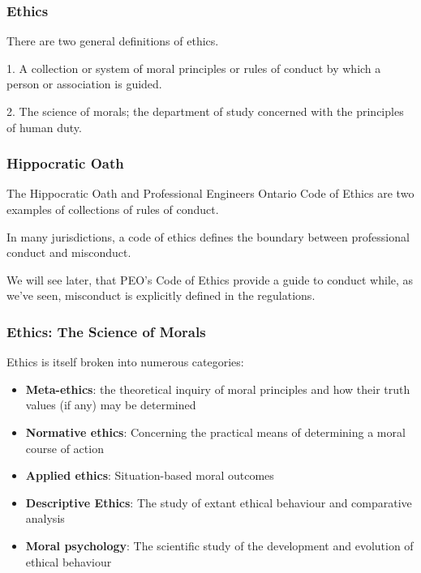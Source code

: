 \begin{frame}
\frametitle{Ethics}

There are two general definitions of ethics.

1. A collection or system of moral principles or rules of conduct by which a person or association is guided.


2. The science of morals; the department of study concerned with the principles of human duty.

\end{frame}



\begin{frame}
\frametitle{Hippocratic Oath}

The Hippocratic Oath and Professional Engineers Ontario Code of Ethics are two examples of collections of rules of conduct.

In many jurisdictions, a code of ethics defines the boundary between professional conduct and misconduct.

We will see later, that PEO's Code of Ethics provide a guide to conduct while, as we've seen, misconduct is explicitly defined in the regulations.

\end{frame}



\begin{frame}
\frametitle{Ethics: The Science of Morals}


Ethics is itself broken into numerous categories:
\begin{itemize}
	\item \textbf{Meta-ethics}:
the theoretical inquiry of moral principles and how their truth values (if any) may be determined
	\item \textbf{Normative ethics}:
Concerning the practical means of determining a moral course of action
	\item \textbf{Applied ethics}:
Situation-based moral outcomes
	\item \textbf{Descriptive Ethics}:
The study of extant ethical behaviour and comparative analysis
	\item \textbf{Moral psychology}:
The scientific study of the development and evolution of ethical behaviour
\end{itemize}

\end{frame}



